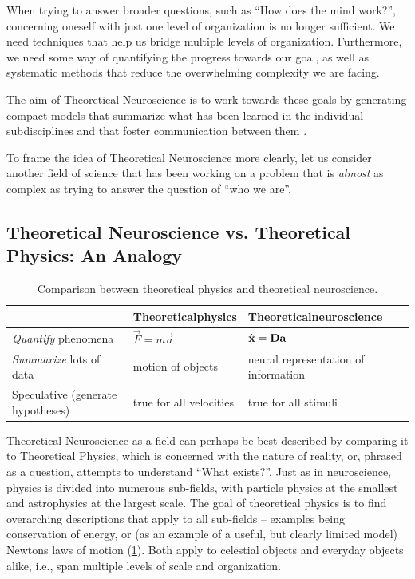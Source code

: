 \documentclass[10pt,letterpaper,oneside]{article}
\begin{document}
When trying to answer broader questions, such as \enquote{How does the mind work?}, concerning oneself with just one level of organization is no longer sufficient. We need techniques that help us bridge multiple levels of organization. Furthermore, we need some way of quantifying the progress towards our goal, as well as systematic methods that reduce the overwhelming complexity we are facing.

The aim of Theoretical Neuroscience is to work towards these goals by generating compact models that summarize what has been learned in the individual subdisciplines and that foster communication between them \cite{abbott2001theoretical}.

To frame the idea of Theoretical Neuroscience more clearly, let us consider another field of science that has been working on a problem that is \emph{almost} as complex as trying to answer the question of \enquote{who we are}.

\subsection{Theoretical Neuroscience vs. Theoretical Physics: An Analogy}

\begin{table}[h]
	\centering
	\caption{Comparison between theoretical physics and theoretical neuroscience.}
	\begin{tabular}{p{4cm} p{4cm} p{4cm}}
		\toprule
								  &
								  \textbf{Theoretical\newline physics} & \textbf{Theoretical\newline neuroscience} \\
		\midrule
		\raggedleft\emph{Quantify} phenomena & $\vec{F} = m \vec{a}$ & $\hat{{\mathbf{x}}} = {\mathbf{D}} {\mathbf{a}}$ \\
		\midrule
		\raggedleft \emph{Summarize} lots of data & motion of objects & neural representation of information \\
		\midrule
		\raggedleft Speculative (generate hypotheses) & true for all velocities & true for all stimuli \\
		\bottomrule
	\end{tabular}
	\label{tbl:physics_vs_theoretical_neuroscience}
\end{table}

Theoretical Neuroscience as a field can perhaps be best described by comparing it to Theoretical Physics, which is concerned with the nature of reality, or, phrased as a question, attempts to understand \enquote{What exists?}. Just as in neuroscience, physics is divided into numerous sub-fields, with particle physics at the smallest and astrophysics at the largest scale. The goal of theoretical physics is to find overarching descriptions that apply to all sub-fields -- examples being conservation of energy, or (as an example of a useful, but clearly limited model) Newtons laws of motion (\cref{tbl:physics_vs_theoretical_neuroscience}). Both apply to celestial objects and everyday objects alike, i.e., span multiple levels of scale and organization.
\end{document}
